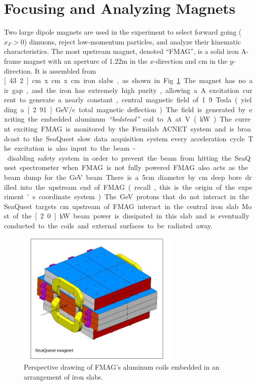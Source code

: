 \section{Focusing and Analyzing Magnets}

Two large dipole magnets are used in the experiment to select forward going ($x_F > 0$) dimuons, reject low-momentum particles, and analyze their kinematic characteristics. The most upstream magnet, denoted ``FMAG'', is a solid iron A-frame magnet with an aperture of 1.22m in the $x$-direction and \unit[66]{cm} in the $y$-direction. It is assembled from \unit[43.2]{cm} x \unit[160]{cm} x \unit[503]{cm} iron slabs, as shown in Fig.~\ref{fig:FMAG}. The magnet has no air gap, and the iron has extremely high purity, allowing a \unit[2000]{A} excitation current to generate a nearly constant, central magnetic field of 1.9 Tesla (yielding a \unit[2.91]{GeV/c} total magnetic deflection). The field is generated by exciting the embedded aluminum \emph{``bedstead''} coil to \unit[2000]{A} at \unit[25]{V} (\unit[50]{kW}).  The current exciting FMAG is monitored by the Fermilab ACNET system and is broadcast to the SeaQuest slow data acquisition system every acceleration cycle. The excitation is also input to the beam-disabling safety system in order to prevent the beam from hitting the SeaQuest spectrometer when FMAG is not fully powered. FMAG also acts as the beam dump for the \unit[120]{GeV} beam. There is a 5cm diameter by \unit[25]{cm} deep bore drilled into the upstream end of FMAG (recall, this is the origin of the experiment's coordinate system).  The \unit[120]{GeV} protons that do not interact in the SeaQuest targets \unit[125]{cm} upstream of FMAG interact in the central iron slab.  Most of the \unit[2.0]{kW} beam power is dissipated in this slab and is eventually conducted to the coils and external surfaces to be radiated away.

\begin{figure}
	\centering
	\includegraphics[width=8cm]{figures/apparatus/FMAG}
	\caption{Perspective drawing of FMAG's aluminum coils embedded in an arrangement of iron slabs.}
	\label{fig:FMAG}
\end{figure}

